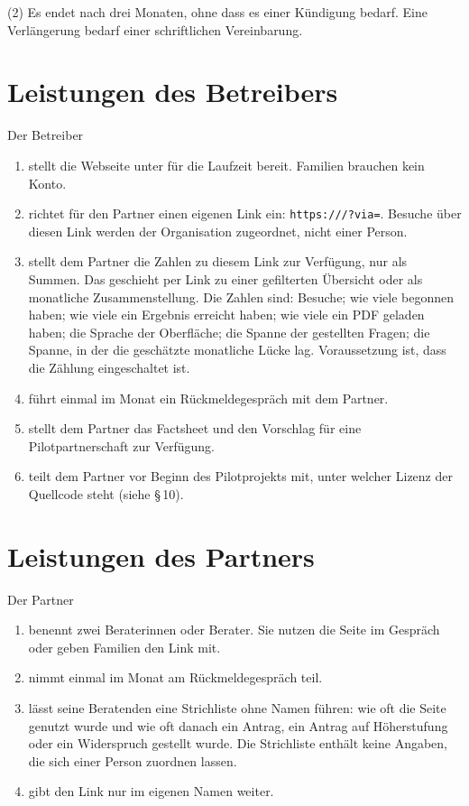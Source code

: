 \documentclass[fontsize=11pt,paper=a4,parskip=half]{scrartcl}
\begin{document}
(2) Es endet nach drei Monaten, ohne dass es einer Kündigung bedarf. Eine
Verlängerung bedarf einer schriftlichen Vereinbarung.

\section{Leistungen des Betreibers}
Der Betreiber
\begin{enumerate}[label=(\arabic*)]
  \item stellt die Webseite unter  für die Laufzeit
    bereit. Familien brauchen kein Konto.
  \item richtet für den Partner einen eigenen Link ein:
    \texttt{https://}\texttt{/?via=}.
    Besuche über diesen Link werden der Organisation zugeordnet, nicht einer
    Person.
  \item stellt dem Partner die Zahlen zu diesem Link zur Verfügung, nur als
    Summen. Das geschieht per Link zu einer gefilterten Übersicht oder als
    monatliche Zusammenstellung. Die Zahlen sind: Besuche; wie viele begonnen
    haben; wie viele ein Ergebnis erreicht haben; wie viele ein PDF geladen
    haben; die Sprache der Oberfläche; die Spanne der gestellten Fragen; die
    Spanne, in der die geschätzte monatliche Lücke lag. Voraussetzung ist, dass
    die Zählung eingeschaltet ist.
  \item führt einmal im Monat ein Rückmeldegespräch mit dem Partner.
  \item stellt dem Partner das Factsheet und den Vorschlag für eine
    Pilotpartnerschaft zur Verfügung.
  \item teilt dem Partner vor Beginn des Pilotprojekts mit, unter welcher Lizenz
    der Quellcode steht (siehe §\,10).
\end{enumerate}

\section{Leistungen des Partners}
Der Partner
\begin{enumerate}[label=(\arabic*)]
  \item benennt zwei Beraterinnen oder Berater. Sie nutzen die Seite im Gespräch
    oder geben Familien den Link mit.
  \item nimmt einmal im Monat am Rückmeldegespräch teil.
  \item lässt seine Beratenden eine Strichliste ohne Namen führen: wie oft die
    Seite genutzt wurde und wie oft danach ein Antrag, ein Antrag auf
    Höherstufung oder ein Widerspruch gestellt wurde. Die Strichliste enthält
    keine Angaben, die sich einer Person zuordnen lassen.
  \item gibt den Link nur im eigenen Namen weiter.
\end{enumerate}
\end{document}
